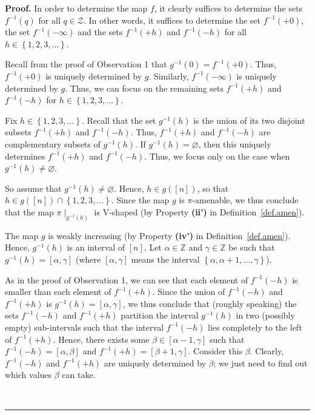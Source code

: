 \documentclass[numbers=enddot,12pt,final,onecolumn,notitlepage]{scrartcl}%
\theoremstyle{definition}
\newenvironment{proof}[1][Proof]{\noindent\textbf{#1.} }{\ \rule{0.5em}{0.5em}}
\newenvironment{vershort}{}{}
\begin{document}
\begin{vershort}
\begin{proof}
In order to determine the map $f$, it clearly suffices to determine the sets
$f^{-1}\left(  q\right)  $ for all $q\in\mathcal{Z}$. In other words, it
suffices to determine the set $f^{-1}\left(  +0\right)  $, the set
$f^{-1}\left(  -\infty\right)  $ and the sets $f^{-1}\left(  +h\right)  $ and
$f^{-1}\left(  -h\right)  $ for all $h\in\left\{  1,2,3,\ldots\right\}  $.

Recall from the proof of Observation 1 that $g^{-1}\left(  0\right)
=f^{-1}\left(  +0\right)  $. Thus, $f^{-1}\left(  +0\right)  $ is uniquely
determined by $g$. Similarly, $f^{-1}\left(  -\infty\right)  $ is uniquely
determined by $g$. Thus, we can focus on the remaining sets $f^{-1}\left(
+h\right)  $ and $f^{-1}\left(  -h\right)  $ for $h\in\left\{  1,2,3,\ldots
\right\}  $.

Fix $h\in\left\{  1,2,3,\ldots\right\}  $. Recall that the set $g^{-1}\left(
h\right)  $ is the union of its two disjoint subsets $f^{-1}\left(  +h\right)
$ and $f^{-1}\left(  -h\right)  $. Thus, $f^{-1}\left(  +h\right)  $ and
$f^{-1}\left(  -h\right)  $ are complementary subsets of $g^{-1}\left(
h\right)  $. If $g^{-1}\left(  h\right)  =\varnothing$, then this uniquely
determines $f^{-1}\left(  +h\right)  $ and $f^{-1}\left(  -h\right)  $. Thus,
we focus only on the case when $g^{-1}\left(  h\right)  \neq\varnothing$.

So assume that $g^{-1}\left(  h\right)  \neq\varnothing$. Hence, $h\in
g\left(  \left[  n\right]  \right)  $, so that $h\in g\left(  \left[
n\right]  \right)  \cap\left\{  1,2,3,\ldots\right\}  $. Since the map $g$ is
$\pi$-amenable, we thus conclude that the map $\pi\mid_{g^{-1}\left(
h\right)  }$ is V-shaped (by Property \textbf{(ii')} in
Definition~\ref{def.amen}).

The map $g$ is weakly increasing (by Property \textbf{(iv')} in
Definition~\ref{def.amen}). Hence,
$g^{-1}\left(  h\right)  $ is an interval of $\left[  n\right]  $. Let
$\alpha\in\mathbb{Z}$ and $\gamma\in\mathbb{Z}$ be such that $g^{-1}\left(
h\right)  =\left[  \alpha,\gamma\right]  $ (where $\left[  \alpha
,\gamma\right]  $ means the interval $\left\{  \alpha,\alpha+1,\ldots
,\gamma\right\}  $).

As in the proof of Observation 1, we can see that each element of
$f^{-1}\left(  -h\right)  $ is smaller than each element of $f^{-1}\left(
+h\right)  $. Since the union of $f^{-1}\left(  -h\right)  $ and
$f^{-1}\left(  +h\right)  $ is $g^{-1}\left(  h\right)  =\left[  \alpha
,\gamma\right]  $, we thus conclude that (roughly speaking) the
sets $f^{-1}\left(  -h\right)  $ and $f^{-1}\left(  +h\right)  $
partition the interval $g^{-1}\left(h\right)$ in two (possibly empty)
sub-intervals such that the interval $f^{-1}\left(  -h\right)  $ lies
completely to the left of $f^{-1}\left(  +h\right)  $.
Hence, there exists some $\beta\in\left[
\alpha-1,\gamma\right]  $ such that $f^{-1}\left(  -h\right)  =\left[
\alpha,\beta\right]  $ and $f^{-1}\left(  +h\right)  =\left[  \beta
+1,\gamma\right]  $. Consider this $\beta$. Clearly, $f^{-1}\left(  -h\right)
$ and $f^{-1}\left(  +h\right)  $ are uniquely determined by $\beta$; we just
need to find out which values $\beta$ can take.


\end{proof}
\end{vershort}
\end{document}
